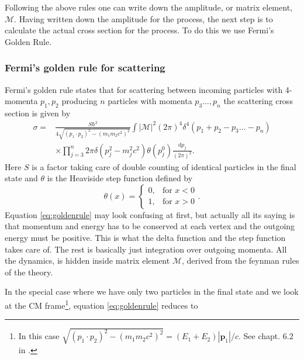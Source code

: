 Following the above rules one can write down the amplitude, or matrix element, $\mathcal{M}$. Having written down the amplitude for the process, the next step is to calculate the actual cross section for the process. To do this we use Fermi's Golden Rule.
% 
\subsubsection{Fermi's golden rule for scattering}
Fermi's golden rule states that for scattering between incoming particles with 4-momenta $p_1, p_2$ producing $n$ particles with momenta $p_3 \dots , p_n$ the scattering cross section is given by \cite{griffiths1987iep}
\begin{align} \label{eq:goldenrule}
	\sigma = &\frac{S\hbar^2}{4\sqrt{(p_1 \cdot p_2)^2 - (m_1 m_2 c^2)^2}} \int |\mathcal{M}|^2 (2 \pi)^4 \delta^4(p_1+p_2-p_3 \dots -p_n) \nonumber \\
	&\times \prod_{j=3}^n 2\pi \delta(p_j^2 - m_j^2c^2)\theta(p_j^0) \frac{\textrm{d}p_j}{(2\pi)^2}.
\end{align}
Here $S$ is a factor taking care of double counting of identical particles in the final state and $\theta$ is the Heaviside step function defined by
\begin{equation}
	 \theta(x) = 
	\begin{cases} 
	  0,  & \mbox{for }x < 0 \\
	  1,  & \mbox{for }x > 0 
	\end{cases}.
\end{equation}
Equation \eqref{eq:goldenrule} may look confusing at first, but actually all its saying is that momentum and energy has to be conserved at each vertex and the outgoing energy must be positive. This is what the delta function and the step function takes care of. The rest is basically just integration over outgoing momenta. All the dynamics, is hidden inside matrix element $\mathcal{M}$, derived from the feynman rules of the theory.

In the special case where we have only two particles in the final state and we look at the CM frame\footnote{In this case $\sqrt{(p_1\cdot p_2)^2 - (m_1m_2 c^2)^2} = (E_1+E_2)|\mathbf{p}_1|/c$. See chapt. 6.2 in \cite{griffiths1987iep}.}, equation \eqref{eq:goldenrule} reduces to


